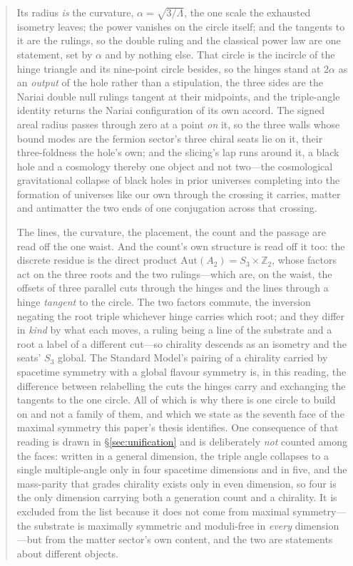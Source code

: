\documentclass[11pt,a4paper]{article}
\theoremstyle{definition}
\begin{document}
\begin{abstract}
Its radius \emph{is} the curvature, $\alpha=\sqrt{3/\Lambda}$, the one scale
the exhausted isometry leaves; the power vanishes on the circle itself; and the
tangents to it are the rulings, so the double ruling and the classical power law
are one statement, set by $\alpha$ and by nothing else. That circle is the
incircle of the hinge triangle and its nine-point circle besides, so the hinges
stand at $2\alpha$ as an \emph{output} of the hole rather than a stipulation, the
three sides are the Nariai double null rulings tangent at their midpoints, and the
triple-angle identity returns the Nariai configuration of its own accord. The
signed areal radius passes through zero at a point \emph{on} it, so the three
walls whose bound modes are the fermion sector's three chiral seats lie on
it, their three-foldness the hole's own; and the slicing's lap runs around it, a black hole and a cosmology thereby one object and not two---the
cosmological gravitational collapse of black holes in prior universes completing
into the formation of universes like our own through the crossing it carries,
matter and antimatter the two ends of one conjugation across that crossing. 

The lines, the curvature, the placement, the count and the passage
are read off the one waist. And the count's own structure is read off it too: the
discrete residue is the direct product $\mathrm{Aut}(A_{2})=S_{3}\times\mathbb{Z}_{2}$,
whose factors act on the three roots and the two rulings---which are, on the waist,
the offsets of three parallel cuts through the hinges and the lines through a hinge
\emph{tangent} to the circle. The two factors commute, the inversion negating the root
triple whichever hinge carries which root; and they differ in
\emph{kind} by what each moves, a ruling being a line of the substrate and a root
a label of a different cut---so chirality descends as an isometry and the seats' $S_{3}$ global. The
Standard Model's pairing of a chirality carried by spacetime symmetry with a global flavour symmetry is, in this
reading, the difference between relabelling the cuts the hinges carry and exchanging the tangents to the one circle. All of which is why there is one circle to
build on and not a family of them, and which we state as the seventh face of the
maximal symmetry this paper's thesis identifies. One consequence of that reading is
drawn in \S\ref{sec:unification} and is deliberately \emph{not} counted among the
faces: written in a general dimension, the triple angle collapses to a single
multiple-angle only in four spacetime dimensions and in five, and the mass-parity that
grades chirality exists only in even dimension, so four is the only dimension carrying
both a generation count and a chirality. It is excluded from the list because it does
not come from maximal symmetry---the substrate is maximally symmetric and moduli-free
in \emph{every} dimension---but from the matter sector's own content, and the two are
statements about different objects.



\end{abstract}
\end{document}
